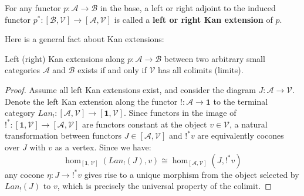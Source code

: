 \begin{defn}
  For any functor $p : \mathcal{A} \to \mathcal{B}$ in the base, a left or right adjoint to the induced functor $p^* : [\mathcal{B}, \mathcal{V}] \to [\mathcal{A}, \mathcal{V}]$ is called a \textbf{left or right Kan extension} of $p$.
\end{defn}
Here is a general fact about Kan extensions:
  \begin{thm}\label{kanlimits}
    Left (right) Kan extensions along $p : \mathcal{A} \to \mathcal{B}$ between two arbitrary small categories $\mathcal{A}$ and $\mathcal{B}$ exists if and only if $\mathcal{V}$ has all colimits (limits).
    \begin{proof}Assume all left Kan extensions exist, and consider the diagram $J : \mathcal{A} \to \mathcal{V}$. Denote the left Kan extension along the functor $! : \mathcal{A} \to \mathbf{1}$ to the terminal category $Lan_! : [\mathcal{A}, \mathcal{V}] \to [\mathbf{1}, \mathcal{V}]$. Since functors in the image of $!^* : [\mathbf{1}, \mathcal{V}] \to [\mathcal{A}, \mathcal{V}]$ are functors constant at the object $v \in \mathcal{V}$, a natural transformation between functors $J \in [\mathcal{A}, \mathcal{V}]$ and $!^*v$ are equivalently cocones over $J$ with $v$ as a vertex. Since we have:
      \[
        \hom_{[\mathbf{1},\mathcal{V}]}(Lan_!(J), v) \cong \hom_{[\mathcal{A},\mathcal{V}]}(J, !^*v)
      \]
      any cocone $\eta : J \to !^*v$ gives rise to a unique morphism from the object selected by $Lan_!(J)$ to $v$, which is precisely the universal property of the colimit.


\end{proof}
\end{thm}
